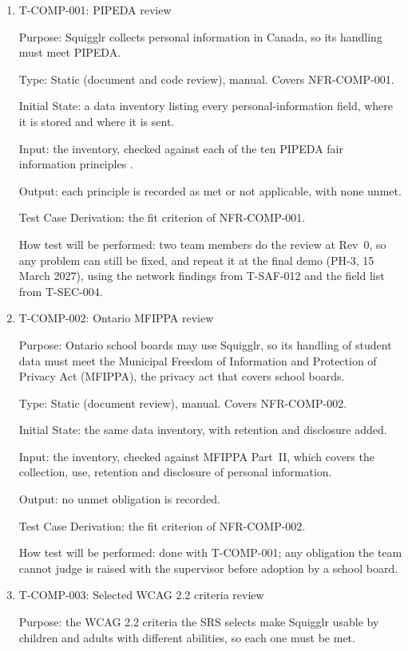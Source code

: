 \documentclass[12pt, titlepage]{article}
\newcommand{\testitem}[1]{\item #1\par\nopagebreak}
\begin{document}
\begin{enumerate}

\testitem{T-COMP-001: PIPEDA review}

Purpose: Squigglr collects personal information in Canada, so its handling must meet PIPEDA.

Type: Static (document and code review), manual. Covers NFR-COMP-001.

Initial State: a data inventory listing every personal-information
field, where it is stored and where it is sent.

Input: the inventory, checked against each of the ten PIPEDA fair
information principles \citep{pipeda}.

Output: each principle is recorded as met or not applicable, with none
unmet.

Test Case Derivation: the fit criterion of NFR-COMP-001.

How test will be performed: two team members do the review at Rev~0, so
any problem can still be fixed, and repeat it at the final demo (PH-3, 15
March 2027), using the network findings from T-SAF-012 and the field list
from T-SEC-004.

\testitem{T-COMP-002: Ontario MFIPPA review}

Purpose: Ontario school boards may use Squigglr, so its handling of student data
must meet the Municipal Freedom of Information and Protection of Privacy Act
(MFIPPA), the privacy act that covers school boards.

Type: Static (document review), manual. Covers NFR-COMP-002.

Initial State: the same data inventory, with retention and disclosure
added.

Input: the inventory, checked against MFIPPA Part~II, which covers the
collection, use, retention and disclosure of personal information.

Output: no unmet obligation is recorded.

Test Case Derivation: the fit criterion of NFR-COMP-002.

How test will be performed: done with T-COMP-001; any obligation the
team cannot judge is raised with the supervisor before adoption by a
school board.

\testitem{T-COMP-003: Selected WCAG 2.2 criteria review}

Purpose: the WCAG 2.2 criteria the SRS selects make Squigglr usable by
children and adults with different abilities, so each one must be met.


\end{enumerate}
\end{document}

